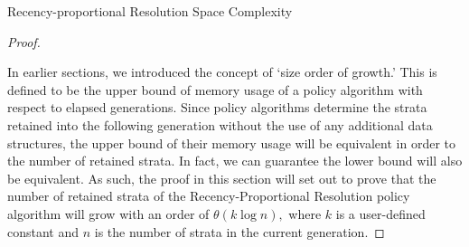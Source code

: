 \begin{theorem}{Recency-proportional Resolution Space Complexity}
\label{thm:recency-proportional-resolution-algo-space-complexity}

\end{theorem}

\begin{proof}
\label{prf:recency-proportional-resolution-algo-space-complexity}

In earlier sections, we introduced the concept of `size order of growth.'
This is defined to be the upper bound of memory usage of a policy algorithm with respect to elapsed generations.
Since policy algorithms determine the strata retained into the following generation without the use of any additional data structures, the upper bound of their memory usage will be equivalent in order to the number of retained strata.
In fact, we can guarantee the lower bound will also be equivalent.
As such, the proof in this section will set out to prove that the number of retained strata of the Recency-Proportional Resolution policy algorithm will grow with an order of $\theta(k \log{n}),$ where $k$ is a user-defined constant and $n$ is the number of strata in the current generation.

\end{proof}
